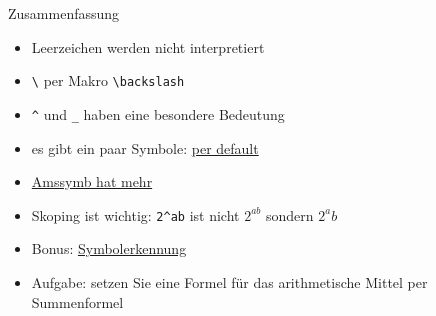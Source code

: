 \begin{frame}[fragile]{Zusammenfassung}
    \begin{itemize}[<+->]
        \item Leerzeichen werden nicht interpretiert
        \item \texttt{\textbackslash} per Makro \lstinline|\backslash|
        \item \lstinline|^| und \lstinline|_| haben eine besondere Bedeutung
        \item es gibt ein paar Symbole: \href{https://en.wikibooks.org/wiki/LaTeX/Mathematics#List_of_Mathematical_Symbols}{per default}
        \item \href{http://milde.users.sourceforge.net/LUCR/Math/mathpackages/amssymb-symbols.pdf}{Amssymb hat mehr}
        \item Skoping ist wichtig: \lstinline|2^ab| ist nicht $ 2^{ab} $ sondern $ 2^ab$
        \item Bonus: \href{http://detexify.kirelabs.org/classify.html}{Symbolerkennung}
        \item Aufgabe: setzen Sie eine Formel für das arithmetische Mittel per Summenformel
    \end{itemize}
\end{frame}

